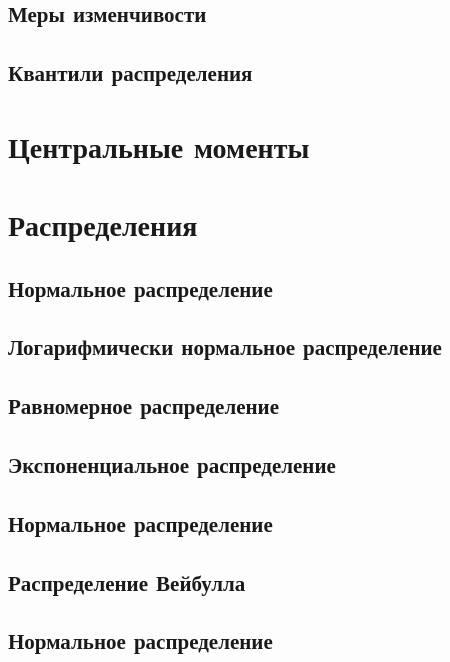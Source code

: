\documentclass[]{scrartcl}
\begin{document}
\subsection{Меры изменчивости}

\subsection{Квантили распределения}

\section{Центральные моменты}\label{moments}

\section{Распределения}

\subsection{Нормальное распределение}

\subsection{Логарифмически нормальное распределение}

\subsection{Равномерное распределение}

\subsection{Экспоненциальное распределение}

\subsection{Нормальное распределение}

\subsection{Распределение Вейбулла}

\subsection{Нормальное распределение}
\end{document}
